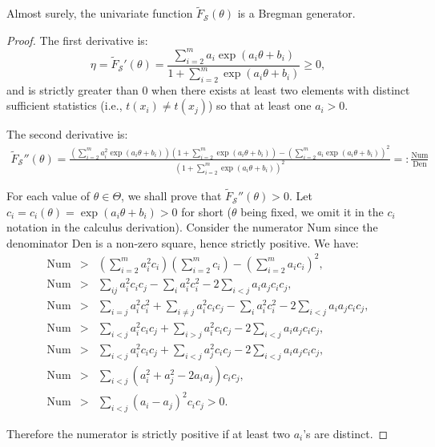 \documentclass[graybox]{svmult}
\def\Num{\mathrm{Num}}
\def\Den{\mathrm{Den}}
\def\defeq{{=:}}
\def\tildeF{\tilde{F}}
\def\calS{\mathcal{S}}
\begin{document}
\begin{lemma}
Almost surely, the univariate function $\tildeF_\calS(\theta)$ is a Bregman generator.
\end{lemma}

\begin{proof}
The first derivative is:
\begin{equation}
\eta= \tildeF_\calS'(\theta)=\frac{ \sum_{i=2}^m a_i\exp(a_i\theta+b_i)}{1+ \sum_{i=2}^m \exp(a_i\theta+b_i)} \geq 0,
\end{equation}
and is strictly greater than $0$ when there exists at least two elements with distinct sufficient statistics (i.e., $t(x_i)\not= t(x_j)$) so that at least one $a_i>0$.

The second derivative is:
\begin{eqnarray}
\tildeF_\calS''(\theta)=\frac{ \left(\sum_{i=2}^m a_i^2\exp(a_i\theta+b_i)\right)  \left(1+ \sum_{i=2}^m \exp(a_i\theta+b_i)\right)
- \left(\sum_{i=2}^m a_i\exp(a_i\theta+b_i)\right)^2
 }{(1+ \sum_{i=2}^m \exp(a_i\theta+b_i))^2}  \defeq \frac{\Num}{\Den} 
\end{eqnarray}
 
 
For each value of $\theta\in\Theta$, we shall prove that $\tildeF_\calS''(\theta)>0$.
Let $c_i=c_i(\theta)=\exp(a_i\theta+b_i)>0$ for short ($\theta$ being fixed, we omit it in the $c_i$ notation in the  calculus derivation).
Consider the numerator $\Num$ since the denominator $\Den$ is a non-zero square, hence strictly positive.
We have:
\begin{eqnarray}
\Num &>& \left(\sum_{i=2}^m a_i^2 c_i\right)  \left(\sum_{i=2}^m c_i\right) - \left(\sum_{i=2}^m a_i c_i\right)^2,\\
\Num &>& \sum_{ij} a_i^2c_ic_j - \sum_i a_i^2c_i^2 -2\sum_{i<j} a_ia_jc_ic_j,\\
\Num &>& \sum_{i=j} a_i^2c_i^2 + \sum_{i\not =j} a_i^2c_ic_j - \sum_i a_i^2c_i^2 -2\sum_{i<j} a_ia_jc_ic_j,\\
\Num &>& \sum_{i<j} a_i^2c_ic_j+\sum_{i>j} a_i^2c_ic_j-2\sum_{i<j} a_ia_jc_ic_j,\\
\Num &>& \sum_{i<j} a_i^2c_ic_j+\sum_{i<j} a_j^2c_ic_j -2\sum_{i<j} a_ia_jc_ic_j,\\
\Num  &>&  \sum_{i<j}   (a_i^2+a_j^2-2a_ia_j) c_ic_j,\\
\Num &>& \sum_{i<j} (a_i-a_j)^2 c_ic_j >0.
\end{eqnarray}

Therefore the numerator is strictly positive if at least two $a_i$'s are distinct.
\end{proof}
\end{document}
